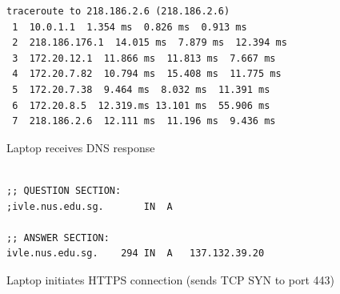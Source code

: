 

\begin{frame}[fragile]\footnotesize
\begin{verbatim}
traceroute to 218.186.2.6 (218.186.2.6)
 1  10.0.1.1  1.354 ms  0.826 ms  0.913 ms
 2  218.186.176.1  14.015 ms  7.879 ms  12.394 ms
 3  172.20.12.1  11.866 ms  11.813 ms  7.667 ms
 4  172.20.7.82  10.794 ms  15.408 ms  11.775 ms
 5  172.20.7.38  9.464 ms  8.032 ms  11.391 ms
 6  172.20.8.5  12.319.ms 13.101 ms  55.906 ms
 7  218.186.2.6  12.111 ms  11.196 ms  9.436 ms
\end{verbatim}
\end{frame}

\begin{cf}{
	Laptop receives DNS response
	}
\end{cf}

\begin{frame}[fragile]\footnotesize
\begin{verbatim}

;; QUESTION SECTION:
;ivle.nus.edu.sg.		IN	A

;; ANSWER SECTION:
ivle.nus.edu.sg.	294	IN	A	137.132.39.20

\end{verbatim}
\end{frame}

\begin{cf}{
	Laptop initiates HTTPS connection
	(sends TCP SYN to port 443)
	}
\end{cf}

\begin{cf}{
}
\end{cf}

